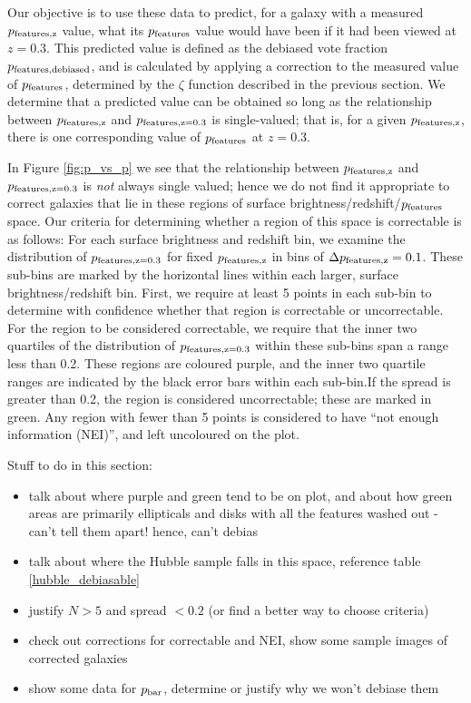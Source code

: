 \documentclass[usenatbib]{mn2e}
\newcommand{\pbar}{p_{\rm bar}}
\begin{document}
Our objective is to use these data to predict, for a galaxy with a measured $p_{\rm features,z}$ value, what its $p_{\rm features}$ value would have been if it had been viewed at $z=0.3$. This predicted value is defined as the debiased vote fraction $p_{\rm features,debiased}$, and is calculated by applying a correction to the measured value of $p_{\rm features}$, determined by the $\zeta$ function described in the previous section. We determine that a predicted value can be obtained so long as the relationship between $p_{\rm features,z}$ and $p_{\rm features,z=0.3}$ is single-valued; that is, for a given $p_{\rm features,z}$, there is one corresponding value of $p_{\rm features}$ at $z=0.3$. 

In Figure \ref{fig:p_vs_p} we see that the relationship between $p_{\rm features,z}$ and $p_{\rm features,z=0.3}$ is \emph{not} always single valued; hence we do not find it appropriate to correct galaxies that lie in these regions of surface brightness/redshift/$p_{\rm features}$ space. Our criteria for determining whether a region of this space is correctable is as follows: For each surface brightness and redshift bin, we examine the distribution of $p_{\rm features,z=0.3}$ for fixed $p_{\rm features,z}$ in bins of $\Delta p_{\rm features,z} = 0.1$. These sub-bins are marked by the horizontal lines within each larger, surface brightness/redshift bin. First, we require at least 5 points in each sub-bin to determine with confidence whether that region is correctable or uncorrectable. For the region to be considered correctable, we require that the inner two quartiles of the distribution of $p_{\rm features,z=0.3}$ within these sub-bins span a range less than 0.2. These regions are coloured purple, and the inner two quartile ranges are indicated by the black error bars within each sub-bin.If the spread is greater than 0.2, the region is considered uncorrectable; these are marked in green. Any region with fewer than 5 points is considered to have ``not enough information (NEI)'', and left uncoloured on the plot. 

Stuff to do in this section: 

\begin{itemize}
\item talk about where purple and green tend to be on plot, and about how green areas are primarily ellipticals and disks with all the features washed out - can't tell them apart! hence, can't debias
\item talk about where the Hubble sample falls in this space, reference table \ref{hubble_debiasable} 
\item justify $N>5$ and spread $< 0.2$ (or find a better way to choose criteria)
\item check out corrections for correctable and NEI, show some sample images of corrected galaxies
\item show some data for $\pbar$, determine or justify why we won't debiase them  
\end{itemize}
 
\end{document}
